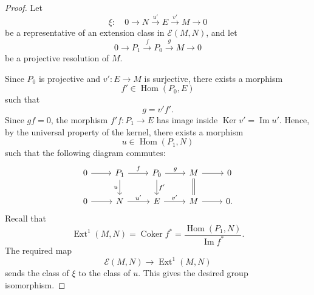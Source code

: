 \documentclass[11pt, a4paper]{report}
\begin{document}
    \begin{proof}
    Let
    \[
        \xi:\quad
        0
        \longrightarrow
        N
        \xrightarrow{u'}
        E
        \xrightarrow{v'}
        M
        \longrightarrow
        0
    \]
    be a representative of an extension class in \(\mathcal E(M,N)\), and let
    \[
        0
        \longrightarrow
        P_1
        \xrightarrow{f}
        P_0
        \xrightarrow{g}
        M
        \longrightarrow
        0
    \]
    be a projective resolution of \(M\).

    Since \(P_0\) is projective and \(v'\colon E\to M\) is surjective, there exists a
    morphism
    \[
        f'\in \operatorname{Hom}(P_0,E)
    \]
    such that
    \[
        g=v'f'.
    \]
    Since \(g f=0\), the morphism \(f'f\colon P_1\to E\) has image inside
    \(\operatorname{Ker}v'=\operatorname{Im}u'\). Hence, by the universal property of
    the kernel, there exists a morphism
    \[
        u\in \operatorname{Hom}(P_1,N)
    \]
    such that the following diagram commutes:
    \[
    \begin{tikzcd}
    0 \arrow[r] &
    P_1 \arrow[r,"f"] \arrow[d,"u"'] &
    P_0 \arrow[r,"g"] \arrow[d,"f'"] &
    M \arrow[r] \arrow[d,equal] &
    0 \\
    0 \arrow[r] &
    N \arrow[r,"u'"] &
    E \arrow[r,"v'"] &
    M \arrow[r] &
    0 .
    \end{tikzcd}
    \]
    Recall that
    \[
        \operatorname{Ext}^1(M,N)
        =
        \operatorname{Coker} f^\ast
        =
        \frac{\operatorname{Hom}(P_1,N)}
             {\operatorname{Im} f^\ast}.
    \]
    The required map
    \[
        \mathcal E(M,N)
        \longrightarrow
        \operatorname{Ext}^1(M,N)
    \]
    sends the class of \(\xi\) to the class of \(u\). This gives the desired group
    isomorphism.
    \end{proof}
\end{document}
